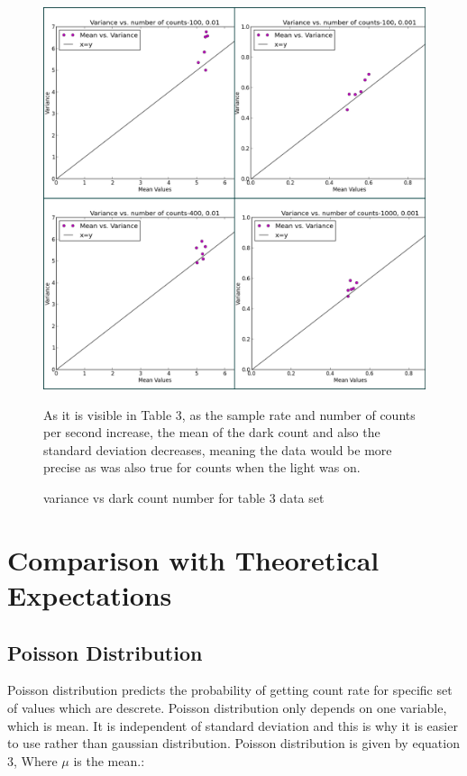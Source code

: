 \documentclass[letterpaper,12pt]{article}
\begin{document}
\begin{figure}
\centering
\includegraphics[scale=0.15]{dark_counts_400_0_Fotor_Collage.png}
\caption{variance vs dark count number for table 3 data set}
As it is visible in Table 3, as the sample rate and number of counts per second increase, the mean of the dark count and also the standard deviation decreases, meaning the data would be more precise as was also true for counts when the light was on.
\end{figure}

\section{Comparison with Theoretical Expectations}
\label{sec:comparison with theoretical expectations}
\subsection{Poisson Distribution}
\label{sec:poisson distribution}
Poisson distribution predicts the probability of getting count rate for specific set of values which are descrete. Poisson distribution only depends on one variable, which is mean. It is independent of standard deviation and this is why it is easier to use rather than gaussian distribution. Poisson distribution is given by equation 3, Where \begin{math}\mu \end{math} is the mean.:
\end{document}
